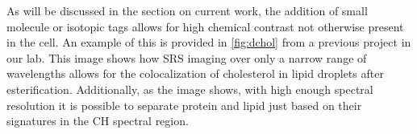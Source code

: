 As will be discussed in the section on current work, the addition of small molecule or isotopic tags allows for high chemical contrast not otherwise present in the cell.  An example of this is provided in \ref{fig:dchol} from a previous project in our lab.\cite{Alfonso-Garcia2015}  This image shows how SRS imaging over only a narrow range of wavelengths allows for the colocalization of cholesterol in lipid droplets after esterification. Additionally, as the image shows, with high enough spectral resolution it is possible to separate protein and lipid just based on their signatures in the CH spectral region.








 




